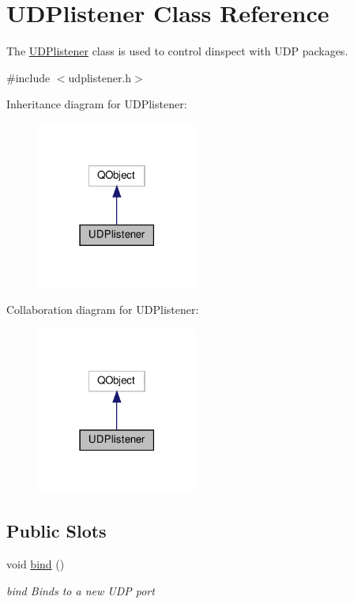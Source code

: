 \hypertarget{classUDPlistener}{}\section{U\+D\+Plistener Class Reference}
\label{classUDPlistener}


The \hyperlink{classUDPlistener}{U\+D\+Plistener} class is used to control dinspect with U\+DP packages.  




{\ttfamily \#include $<$udplistener.\+h$>$}



Inheritance diagram for U\+D\+Plistener\+:\nopagebreak
\begin{figure}[H]
\begin{center}
\leavevmode
\includegraphics[width=150pt]{classUDPlistener__inherit__graph}
\end{center}
\end{figure}


Collaboration diagram for U\+D\+Plistener\+:\nopagebreak
\begin{figure}[H]
\begin{center}
\leavevmode
\includegraphics[width=150pt]{classUDPlistener__coll__graph}
\end{center}
\end{figure}
\subsection*{Public Slots}
\begin{DoxyCompactItemize}
\item 
void \hyperlink{classUDPlistener_a4b7a056403f9b80485c92b82c340109a}{bind} ()
\begin{DoxyCompactList}\small\item\em bind Binds to a new U\+DP port \end{DoxyCompactList}\end{DoxyCompactItemize}
